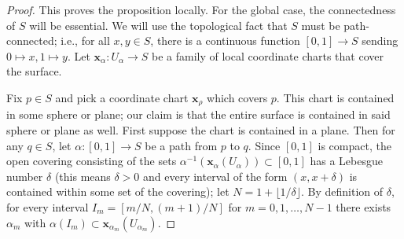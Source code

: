 \documentclass[leqno]{book}
\begin{document}
\begin{proof}
This proves the proposition locally.  For the global case, the connectedness of $S$ will be essential.  We will use the topological fact that $S$ must be path-connected; i.e., for all $x,y\in S$, there is a continuous function $[0,1]\to S$ sending $0\mapsto x,1\mapsto y$.  Let $\mathbf x_\alpha:U_\alpha\to S$ be a family of local coordinate charts that cover the surface. %

Fix $p\in S$ and pick a coordinate chart $\mathbf x_\rho$ which covers $p$.  This chart is contained in some sphere or plane; our claim is that the entire surface is contained in said sphere or plane as well.  First suppose the chart is contained in a plane.  Then for any $q\in S$, let $\alpha:[0,1]\to S$ be a path from $p$ to $q$.  Since $[0,1]$ is compact, the open covering consisting of the sets $\alpha^{-1}(\mathbf x_\alpha(U_\alpha))\subset[0,1]$ has a Lebesgue number $\delta$ (this means $\delta>0$ and every interval of the form $(x,x+\delta)$ is contained within some set of the covering); let $N=1+\lfloor 1/\delta\rfloor$.  By definition of $\delta$, for every interval $I_m=[m/N,(m+1)/N]$ for $m=0,1,\dots,N-1$ there exists $\alpha_m$ with $\alpha(I_m)\subset\mathbf x_{\alpha_m}(U_{\alpha_m})$. %


\end{proof}
\end{document}
